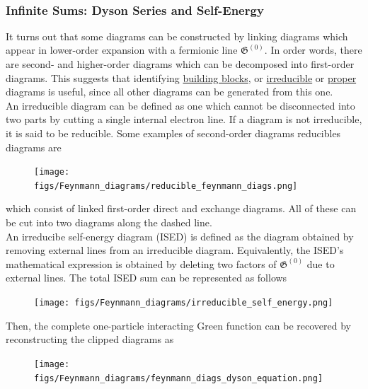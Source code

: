 \blanky \\

\subsubsection{Infinite Sums: Dyson Series and Self-Energy}

It turns out that some diagrams can be constructed by linking diagrams which appear in lower-order expansion with a fermionic line $\mathfrak{G}^{(0)}$. In order words, there are second- and higher-order diagrams which can be decomposed into first-order diagrams. This suggests that identifying \underline{building blocks}, or \underline{irreducible} or \underline{proper} diagrams is useful, since all other diagrams can be generated from this one. \\

An irreducible diagram can be defined as one which cannot be disconnected into two parts by cutting a single internal electron line. If a diagram is not irreducible, it is said to be reducible. Some examples of second-order diagrams reducibles diagrams are 

\begin{figure}[H]
    \centering
    \texttt{[image: figs/Feynmann\_diagrams/reducible\_feynmann\_diags.png]}
\end{figure}

which consist of linked first-order direct and exchange diagrams. All of these can be cut into two diagrams along the dashed line. \\

An irreducibe self-energy diagram (ISED) is defined as the diagram obtained by removing external lines from an irreducible diagram. Equivalently, the ISED's mathematical expression is obtained by deleting two factors of $\mathfrak{G}^{(0)}$ due to external lines. The total ISED sum can be represented as follows 

\begin{figure}[H]
    \centering
    \texttt{[image: figs/Feynmann\_diagrams/irreducible\_self\_energy.png]}
    \label{Feynmann_diags_ISED_sum}
\end{figure}

Then, the complete one-particle interacting Green function can be recovered by reconstructing the clipped diagrams as 

\begin{figure}[H]
    \centering
    \texttt{[image: figs/Feynmann\_diagrams/feynmann\_diags\_dyson\_equation.png]}
\end{figure}

